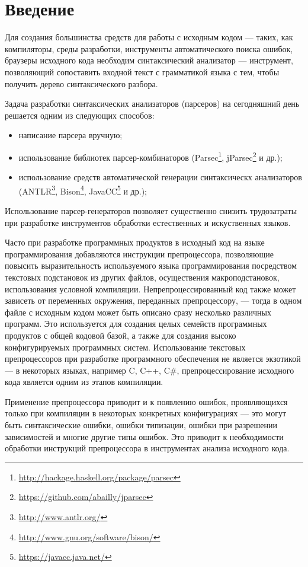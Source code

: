 \clearpage
\section{Введение}

Для создания большинства средств для работы с исходным кодом --- таких, как компиляторы, среды разработки, инструменты автоматического поиска ошибок, браузеры исходного кода необходим синтаксический анализатор --- инструмент, позволяющий сопоставить входной текст с грамматикой языка с тем, чтобы получить дерево синтаксического разбора\cite{aho}.

Задача разработки синтаксических анализаторов (парсеров) на сегодняшний день решается одним из следующих способов:
\begin{itemize}
	\item написание парсера вручную;
	\item использование библиотек парсер-комбинаторов (Parsec\footnote{\url{http://hackage.haskell.org/package/parsec}}, jParsec\footnote{\url{https://github.com/abailly/jparsec}} и др.);
	\item использование средств автоматической генерации синтаксическх анализаторов (ANTLR\footnote{\url{http://www.antlr.org/}}, Bison\footnote{\url{http://www.gnu.org/software/bison/}}, JavaCC\footnote{\url{https://javacc.java.net/}} и др.);
\end{itemize}
Использование парсер-генераторов позволяет существенно снизить трудозатраты при разработке инструментов обработки естественных и искуственных языков.

Часто при разработке программных продуктов в исходный код на языке программирования добавляются инструкции препроцессора, позволяющие повысить выразительность используемого языка программирования посредством текстовых подстановок из других файлов, осуществения макроподстановок, использования условной компиляции. Непрепроцессированный код также может зависеть от переменных окружения, переданных препроцессору, --- тогда в одном файле с исходным кодом может быть описано сразу несколько различных программ. Это используется для создания целых семейств программных продуктов с общей кодовой базой\cite{flightsoftwareproductline}, а также для создания высоко конфигурируемых программных систем. Использование текстовых препроцессоров при разработке программного обеспечения не является экзотикой --- в некоторых языках, например C, C++, C\#, препроцессирование исходного кода является одним из этапов компиляции.

Применение препроцессора приводит и к появлению ошибок, проявляющихся только при компиляции в некоторых конкретных конфигурациях --- это могут быть синтаксические ошибки, ошибки типизации, ошибки при разрешении зависимостей и многие другие типы ошибок. Это приводит к необходимости обработки инструкций препроцессора в инструментах анализа исходного кода.

